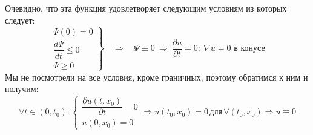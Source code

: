 \documentclass[11pt,a4paper]{report}
\numberwithin{equation}{section}
\numberwithin{figure}{chapter}
\numberwithin{table}{chapter}
\newcommand{\p}{\partial}
\begin{document}
Очевидно, что эта функция удовлетворяет следующим условиям из которых следует:
\[
\left.
\begin{array}{l}
\Psi(0) = 0 \\[4pt]
\dfrac{d\Psi}{dt} \leq 0 \\[4pt]
\Psi \geq 0
\end{array}
\right\}
\quad \Rightarrow \quad
\Psi \equiv 0 \ \Rightarrow \ \dfrac{\partial u}{\partial t} = 0; \ \nabla u = 0 \text{ в конусе}
\]
Мы не посмотрели на все условия, кроме граничных, поэтому обратимся к ним и получим:
\[ \forall t\in(0,t_0):\begin{cases}
    \dfrac{\p u(t,x_0)}{\p t}=0\\
    u(0,x_0)=0
\end{cases} \Rightarrow u(t_0,x_0)=0\, \text{для}\, \forall (t_0,x_0) \Rightarrow u\equiv 0 \]
\end{document}
